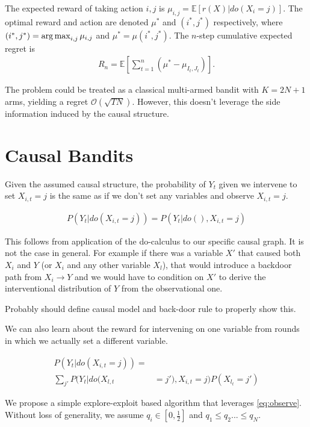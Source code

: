 \documentclass{article}
\newcommand{\E}[1]{\mathbb E\left[#1\right]}
\newcommand{\argmax}{\operatornamewithlimits{arg\,max}}
\newcommand{\eqn}[1]{\begin{align}#1\end{align}}
\newcommand{\eq}[1]{\begin{align*}#1\end{align*}}
\newcommand{\bigo}[1]{\mathcal{O}\left( #1 \right)}
\theoremstyle{plain}
\theoremstyle{definition}
\begin{document}
The expected reward of taking action $i,j$ is $\mu_{i,j} = \E{r(X)|do(X_i = j)}$. The optimal reward and action are denoted $\mu^*$ and $(i^*,j^*)$ respectively,
where $(i^*,j^*) = \argmax_{i,j} \mu_{i,j}$ and $\mu^* = \mu(i^*,j^*)$. The $n$-step cumulative expected regret is
\eq{
R_n = \E {\sum_{t=1}^n \left(\mu^* - \mu_{I_t,J_t}\right)}.
}

The problem could be treated as a classical multi-armed bandit with $K = 2N+1$ arms, yielding a regret $\bigo{\sqrt{TN}}$. However, this doesn't leverage the side information induced by the causal structure.

\section{Causal Bandits}

Given the assumed causal structure, the probability of $Y_t$ given we intervene to set $X_{i,t} = j$ is the same as if we don't set any variables and observe $X_{i,t} = j$. 

\eqn {
\label{eq:observe}
P(Y_t|do(X_{i,t} = j)) = P(Y_t|do(),X_{i,t} = j)
}

This follows from application of the do-calculus \cite{Pearl2000} to our specific causal graph. It is not the case in general. For example if there was a variable $X'$ that caused both $X_i$ and $Y$ (or $X_i$ and any other variable $X_l$), that would introduce a backdoor path from $X_i \rightarrow Y$ and we would have to condition on $X'$ to derive the interventional distribution of $Y$ from the observational one.

\color{red} Probably should define causal model and back-door rule to properly show this.\color{black}

We can also learn about the reward for intervening on one variable from rounds in which we actually set a different variable.

\eqn {
\label{eq:estimation_transfer}
P(Y_t|do(X_{i,t} = j))= & \nonumber \\
 \sum_{j'}  P(Y_t|do(X_{l,t} & = j'),X_{i,t} = j)P(X_{l_t} = j')
}

We propose a simple explore-exploit based algorithm that leverages  \eqref{eq:observe}. Without loss of generality, we assume $q_i \in [0,\frac{1}{2}]$ and $q_1 \leq q_2 ... \leq q_N$. 
\end{document}
